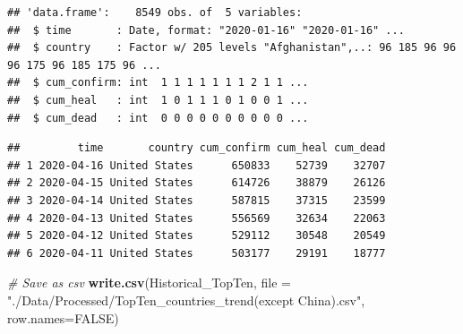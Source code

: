 \documentclass[12pt,]{article}
\newenvironment{Shaded}{\begin{snugshade}}{\end{snugshade}}
\newcommand{\CommentTok}[1]{\textcolor[rgb]{0.56,0.35,0.01}{\textit{#1}}}
\newcommand{\DataTypeTok}[1]{\textcolor[rgb]{0.13,0.29,0.53}{#1}}
\newcommand{\DecValTok}[1]{\textcolor[rgb]{0.00,0.00,0.81}{#1}}
\newcommand{\KeywordTok}[1]{\textcolor[rgb]{0.13,0.29,0.53}{\textbf{#1}}}
\newcommand{\NormalTok}[1]{#1}
\newcommand{\OperatorTok}[1]{\textcolor[rgb]{0.81,0.36,0.00}{\textbf{#1}}}
\newcommand{\OtherTok}[1]{\textcolor[rgb]{0.56,0.35,0.01}{#1}}
\newcommand{\StringTok}[1]{\textcolor[rgb]{0.31,0.60,0.02}{#1}}
\begin{document}
\begin{verbatim}
## 'data.frame':    8549 obs. of  5 variables:
##  $ time       : Date, format: "2020-01-16" "2020-01-16" ...
##  $ country    : Factor w/ 205 levels "Afghanistan",..: 96 185 96 96 96 175 96 185 175 96 ...
##  $ cum_confirm: int  1 1 1 1 1 1 1 2 1 1 ...
##  $ cum_heal   : int  1 0 1 1 1 0 1 0 0 1 ...
##  $ cum_dead   : int  0 0 0 0 0 0 0 0 0 0 ...
\end{verbatim}

\begin{Shaded}
\end{Shaded}

\begin{verbatim}
##         time       country cum_confirm cum_heal cum_dead
## 1 2020-04-16 United States      650833    52739    32707
## 2 2020-04-15 United States      614726    38879    26126
## 3 2020-04-14 United States      587815    37315    23599
## 4 2020-04-13 United States      556569    32634    22063
## 5 2020-04-12 United States      529112    30548    20549
## 6 2020-04-11 United States      503177    29191    18777
\end{verbatim}

\begin{Shaded}
\begin{Highlighting}[]
\CommentTok{# Save as csv}
\KeywordTok{write.csv}\NormalTok{(Historical_TopTen,}
          \DataTypeTok{file =} \StringTok{"./Data/Processed/TopTen_countries_trend(except China).csv"}\NormalTok{, }\DataTypeTok{row.names=}\OtherTok{FALSE}\NormalTok{)}
\end{Highlighting}
\end{Shaded}
\end{document}
